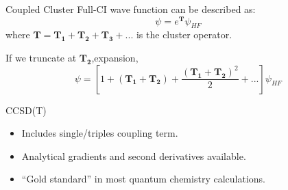 \documentclass[aspectratio=169]{beamer}
\let \vec \mathbf
\begin{document}
\begin{frame}{Coupled Cluster}
    Full-CI wave function can be described as:
    \begin{equation*}
        \psi = e^{\vec{T}}\psi_{HF}
    \end{equation*}
    where $\vec{T}=\vec{T_1}+\vec{T_2}+\vec{T_3}+...$ is the cluster operator.


If we truncate at $\vec{T_2}$,expansion,
    \begin{equation*}
        \psi = [1+(\vec{T_1}+\vec{T_2})+\frac{(\vec{T_1}+\vec{T_2})^2}{2}+...]\psi_{HF}
    \end{equation*}

\begin{alertblock}{CCSD(T)}
\begin{itemize}
    \item Includes single/triples coupling term.
    \item Analytical gradients and second derivatives available.
    \item ``Gold standard'' in most quantum chemistry calculations.
\end{itemize}
\end{alertblock}

\end{frame}
\end{document}
